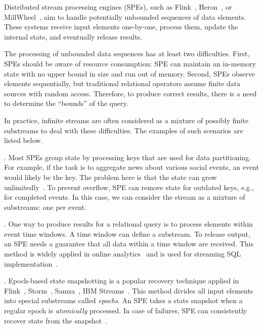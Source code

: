 \label {fs-acker-intro}

Distributed stream processing engines (SPEs), such as Flink~\cite{carbone2015apache}, Heron~\cite{Kulkarni:2015:THS:2723372.2742788}, or MillWheel~\cite{Akidau:2013:MFS:2536222.2536229}, aim to handle potentially unbounded sequences of data elements. These systems receive input elements one-by-one, process them, update the internal state, and eventually release results. 

The processing of unbounded data sequences has at least two difficulties. First, SPEs should be aware of resource consumption: SPE can maintain an in-memory state with no upper bound in size and run out of memory. Second, SPEs observe elements sequentially, but traditional relational operators assume finite data sources with random access. Therefore, to produce correct results, there is a need to determine the ``bounds'' of the query.

In practice, infinite streams are often considered as a mixture of possibly finite substreams to deal with these difficulties. The examples of such scenarios are listed below.

. Most SPEs group state by processing keys that are used for data partitioning. For example, if the task is to aggregate news about various social events, an event would likely be the key. The problem here is that the state can grow unlimitedly~\cite{Tucker:2003:EPS:776752.776780}. To prevent overflow, SPE can remove state for outdated keys, e.g., for completed events. In this case, we can consider the stream as a mixture of substreams: one per event.  

. One way to produce results for a relational query is to process elements within event time windows. A time window can define a substream. To release output, an SPE needs a guarantee that all data within a time window are received. This method is widely applied in online analytics~\cite{traub2018scotty} and is used for streaming SQL implementation~\cite{Begoli:2019:OSR:3299869.3314040}.

. Epoch-based state snapshotting is a popular recovery technique applied in Flink~\cite{Carbone:2017:SMA:3137765.3137777}, Storm~\cite{Toshniwal:2014:STO:2588555.2595641}, Samza~\cite{Noghabi:2017:SSS:3137765.3137770}, IBM Streams~\cite{jacques2016consistent}. This method divides all input elements into special substreams called {\em epochs}. An SPE takes a state snapshot when a regular epoch is {\em atomically} processed. In case of failures, SPE can consistently recover state from the snapshot~\cite{2015arXiv150608603C}. 



